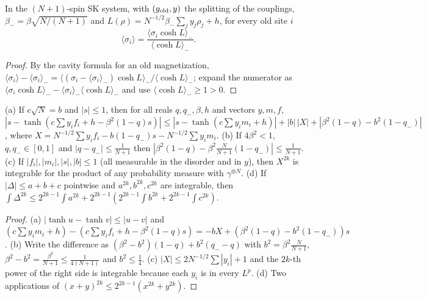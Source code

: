 \begin{lemma}
\label{lem:sg-tal:old-spin-ratio}
  \leanok
{}
In the $(N+1)$-spin SK system, with $(g_{\rm old},y)$ the splitting of the couplings, $\beta_-=\beta\sqrt{N/(N+1)}$ and $L(\rho)=N^{-1/2}\beta_-\sum_jy_j\rho_j+h$, for every old site $i$
\[
\langle\sigma_i\rangle=\frac{\langle\sigma_i\cosh L\rangle_-}{\langle\cosh L\rangle_-}.
\]
\end{lemma}
\begin{proof}
  \leanok
By the cavity formula for an old magnetization, $\langle\sigma_i\rangle-\langle\sigma_i\rangle_-=\langle(\sigma_i-\langle\sigma_i\rangle_-)\cosh L\rangle_-/\langle\cosh L\rangle_-$; expand the numerator as $\langle\sigma_i\cosh L\rangle_--\langle\sigma_i\rangle_-\langle\cosh L\rangle_-$ and use $\langle\cosh L\rangle_-\ge1>0$.
\end{proof}

\begin{lemma}
\label{lem:sg-tal:tap-algebra}
  \leanok
{}
(a) If $c\sqrt N=b$ and $|s|\le1$, then for all reals $q,q_-,\beta,h$ and vectors $y,m,f$,
$|s-\tanh(c\sum y_if_i+h-\beta^2(1-q)s)|\le|s-\tanh(c\sum y_im_i+h)|+|b|\,|X|+|\beta^2(1-q)-b^2(1-q_-)|$, where $X=N^{-1/2}\sum y_if_i-b(1-q_-)s-N^{-1/2}\sum y_im_i$.
(b) If $4\beta^2<1$, $q,q_-\in[0,1]$ and $|q-q_-|\le\frac1{N+1}$ then $|\beta^2(1-q)-\beta^2\frac N{N+1}(1-q_-)|\le\frac1{N+1}$.
(c) If $|f_i|,|m_i|,|s|,|b|\le1$ (all measurable in the disorder and in $y$), then $X^{2k}$ is integrable for the product of any probability measure with $\gamma^{\otimes N}$.
(d) If $|\Delta|\le a+b+c$ pointwise and $a^{2k},b^{2k},c^{2k}$ are integrable, then $\int\Delta^{2k}\le2^{2k-1}\int a^{2k}+2^{2k-1}(2^{2k-1}\int b^{2k}+2^{2k-1}\int c^{2k})$.
\end{lemma}
\begin{proof}
  \leanok
(a) $|\tanh u-\tanh v|\le|u-v|$ and $(c\sum y_im_i+h)-(c\sum y_if_i+h-\beta^2(1-q)s)=-bX+(\beta^2(1-q)-b^2(1-q_-))s$.  (b) Write the difference as $(\beta^2-b^2)(1-q)+b^2(q_--q)$ with $b^2=\beta^2\frac N{N+1}$, $\beta^2-b^2=\frac{\beta^2}{N+1}\le\frac1{4(N+1)}$ and $b^2\le\frac14$.  (c) $|X|\le2N^{-1/2}\sum|y_i|+1$ and the $2k$-th power of the right side is integrable because each $y_i$ is in every $L^p$.  (d) Two applications of $(x+y)^{2k}\le2^{2k-1}(x^{2k}+y^{2k})$.
\end{proof}

